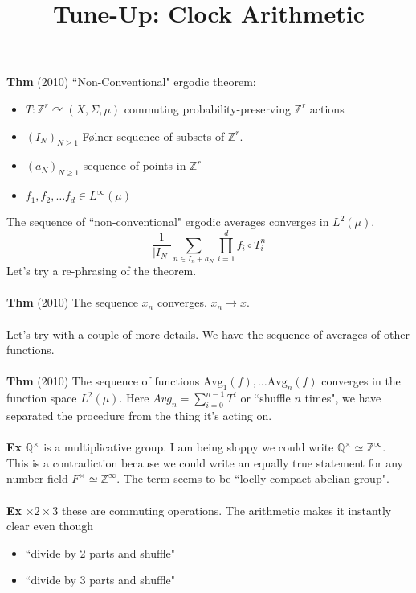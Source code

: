 \documentclass[12pt]{article}
\title{Tune-Up: Clock Arithmetic}
\date{}
\begin{document}
\sffamily

\maketitle

{\fontsize{16pt}{16pt}\selectfont 

\noindent \textbf{Thm} (2010) ``Non-Conventional" ergodic theorem:
\begin{itemize}
\item $T: \mathbb{Z}^r \curvearrowright (X, \Sigma, \mu)$ commuting probability-preserving $\mathbb{Z}^r$ actions
\item $(I_N)_{N \geq 1}$ F\o{}lner sequence of subsets of $\mathbb{Z}^r$.
\item $(a_N)_{N \geq 1}$ sequence of points in $\mathbb{Z}^r$
\item $f_1, f_2, \dots f_d \in L^\infty(\mu)$
\end{itemize}
The sequence of ``non-conventional" ergodic averages converges in $L^2(\mu)$.
$$ \frac{1}{|I_N|} \sum_{n \in I_n + a_N} \prod_{i=1}^d f_i \circ T_i^n $$
Let's try a re-phrasing of the theorem. \\ \\
\textbf{Thm} (2010) The sequence $x_n$ converges.  $x_n \to x$.  \\ \\
Let's try with a couple of more details.  We have the sequence of averages of other functions.\\ \\
\textbf{Thm} (2010) The sequence of functions $\text{Avg}_1(f), \dots \text{Avg}_n(f)$ converges in the function space $L^2(\mu)$.  Here $Avg_n = \sum_{i = 0}^{n-1} T^i$ or ``shuffle $n$ times", we have separated the procedure from the thing it's acting on.\\ \\
\textbf{Ex} $\mathbb{Q}^\times$ is a multiplicative group.  I am being sloppy we could write $\mathbb{Q}^\times \simeq \mathbb{Z}^\infty$.  This is a contradiction because we could write an equally true statement for any number field $F^\times \simeq \mathbb{Z}^\infty$.  The term seems to be ``loclly compact abelian group". \\ \\
\textbf{Ex} $\times 2 \times 3$ these are commuting operations.  The arithmetic makes it instantly clear even though 
\begin{itemize}
\item ``divide by 2 parts and shuffle"
\item ``divide by 3 parts and shuffle"

\end{itemize}}
\end{document}
